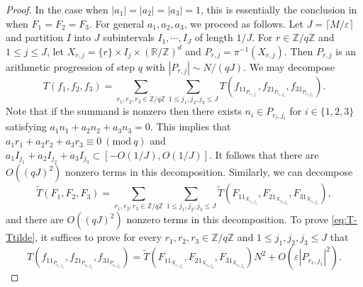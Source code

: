 \documentclass[12pt, notitlepage]{amsart}
\numberwithin{equation}{section}
\def\R{\mathbb R}
\def\Z{\mathbb Z}
\def\wt{\widetilde}
\newcommand{\eps}{\varepsilon}
\newcommand{\Mod}[1]{\ (\mathrm{mod}\ #1)}
\theoremstyle{remark}
\theoremstyle{definition}
\theoremstyle{remark}
\numberwithin{equation}{section}
\begin{document}
\begin{proof}
In the case when $|a_1|=|a_2|=|a_3|=1$, this is essentially the conclusion in \cite[Lemma A.5]{EberhardGreenManners} when $F_1=F_2=F_3$. For general $a_1,a_2,a_3$, we proceed as follows.  Let $J = \lceil M/\eps\rceil$ and partition $I$ into $J$ subintervals $I_1,\cdots,I_J$ of length $1/J$. For $r\in\Z/q\Z$ and $1 \leq j \leq J$, let $X_{r,j} = \{r\} \times I_j \times (\R/\Z)^d$ and $P_{r,j} = \pi^{-1}(X_{r,j})$. Then $P_{r,j}$ is an arithmetic progression of step $q$ with $|P_{r,j}|\sim N/(qJ)$. We may decompose
$$
T(f_1,f_2,f_3) = \sum_{r_1,r_2,r_3 \in \Z/q\Z} \sum_{1 \leq j_1,j_2,j_3 \leq J} T(f_11_{P_{r_1,j_1}}, f_21_{P_{r_2,j_2}}, f_31_{P_{r_3,j_3}}).
$$
Note that if the summand is nonzero then there exists $n_i \in P_{r_i,j_i}$ for $i \in \{1,2,3\}$ satisfying $a_1n_1+a_2n_2+a_3n_3=0$. This implies that $a_1r_1+a_2r_2+a_3r_3\equiv 0\Mod{q}$ and $a_1I_{j_1}+a_2I_{j_2}+a_3I_{j_3} \subset [-O(1/J), O(1/J)]$. It follows that there are $O((qJ)^2)$ nonzero terms in this decomposition. Similarly, we can decompose
$$
\wt{T}(F_1,F_2,F_3) =  \sum_{r_1,r_2,r_3 \in \Z/q\Z} \sum_{1 \leq j_1,j_2,j_3 \leq J} \wt{T}(F_11_{X_{r_1,j_1}}, F_21_{X_{r_2,j_2}}, F_31_{X_{r_3,j_3}}),
$$
and there are $O((qJ)^2)$ nonzero terms in this decomposition. To prove \eqref{eq:T-Ttilde}, it suffices to prove for every $r_1,r_2,r_3 \in \Z/q\Z$ and $1 \leq j_1,j_2,j_3 \leq J$ that
\begin{equation}\label{eq:T-Ttilde2}
T(f_11_{P_{r_1,j_1}}, f_21_{P_{r_2,j_2}}, f_31_{P_{r_3,j_3}}) = \wt{T}(F_11_{X_{r_1,j_1}}, F_21_{X_{r_2,j_2}}, F_31_{X_{r_3,j_3}}) N^2 + O(\eps |P_{r_1,j_1}|^2).
\end{equation}


\end{proof}
\end{document}
